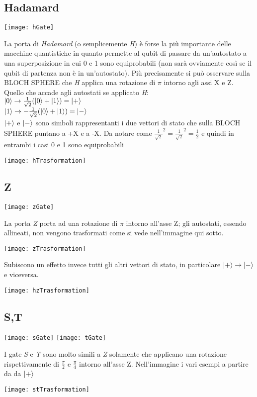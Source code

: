 \subsection{Hadamard}
\begin{center}
\texttt{[image: hGate]}
\end{center}
La porta di \textit{Hadamard} (o semplicemente \textit{H}) è forse la più importante delle macchine quantistiche in quanto permette al qubit di passare da un'autostato a una superposizione in cui 0 e 1 sono equiprobabili (non sarà ovviamente così se il qubit di partenza non è in un'autostato). Più precisamente si può osservare sulla BLOCH SPHERE che \textit{H} applica una rotazione di $\pi$ intorno agli assi X e Z.\\
Quello che accade agli autostati se applicato \textit{H}:\\
$\ket{0} \rightarrow \frac{1}{\sqrt{2}}(\ket{0} + \ket{1}) = \ket{+}$\\
$\ket{1} \rightarrow -\frac{1}{\sqrt{2}}(\ket{0} + \ket{1}) = \ket{-}$\\
$\ket{+}$ e $\ket{-}$ sono simboli rappresentanti i due vettori di stato che sulla BLOCH SPHERE puntano a +X e a -X. Da notare come $\frac{1}{\sqrt{2}}^2 = \frac{1}{\sqrt{2}}^2 = \frac{1}{2}$ e quindi in entrambi i casi 0 e 1 sono equiprobabili
\begin{center}
\texttt{[image: hTrasformation]}
\end{center}
\subsection{Z}
\begin{center}
\texttt{[image: zGate]}
\end{center}
La porta \textit{Z} porta ad una rotazione di $\pi$ intorno all'asse Z; gli autostati, essendo allineati, non vengono trasformati come si vede nell'immagine qui sotto.
\begin{center}
\texttt{[image: zTrasformation]}
\end{center}
Subiscono un effetto invece tutti gli altri vettori di stato, in particolare $\ket{+} \rightarrow \ket{-}$ e viceversa.
\begin{center}
\texttt{[image: hzTrasformation]}
\end{center}
\subsection{S,T}
\begin{center}
\texttt{[image: sGate]}
\texttt{[image: tGate]}
\end{center}
I gate \textit{S} e \textit{T} sono molto simili a \textit{Z} solamente che applicano una rotazione rispettivamente di $\frac{\pi}{2}$ e $\frac{\pi}{4}$ intorno all'asse Z. Nell'immagine i vari esempi a partire da da $\ket{+}$
\begin{center}
\texttt{[image: stTrasformation]}
\end{center}

